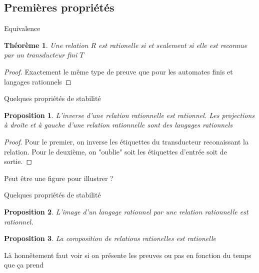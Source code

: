 \documentclass{beamer}
\newtheorem{proposition}{Proposition}
\newtheorem{thm}{Théorème}
\begin{document}
\subsection{Premières propriétés}

\begin{frame}{Equivalence}
    \begin{thm}
        Une relation $R$ est rationelle si et seulement si elle est reconnue par un transducteur fini $T$
    \end{thm}

    \begin{proof}
        Exactement le même type de preuve que pour les automates finis et langages rationnels
    \end{proof}
\end{frame}

\begin{frame}{Quelques propriétés de stabilité}
    \begin{proposition}
        L'inverse d'une relation rationnelle est rationnel. Les projections à droite et à gauche d'une
        relation rationnelle sont des langages rationnels
    \end{proposition}

    \begin{proof}
        Pour le premier, on inverse les étiquettes du transducteur reconaissant la relation. Pour le deuxième, on
        "oublie" soit les étiquettes d'entrée soit de sortie.
    \end{proof}

    Peut être une figure pour illustrer ?
\end{frame}

\begin{frame}{Quelques propriétés de stabilité}
    \begin{proposition}
        L'image d'un langage rationnel par une relation rationnelle est rationnel.
    \end{proposition}
    \begin{proposition}
        La composition de relations rationelles est rationelle
    \end{proposition}

    Là honnêtement faut voir si on présente les preuves ou pas en fonction du temps que ça prend
\end{frame}
\end{document}

